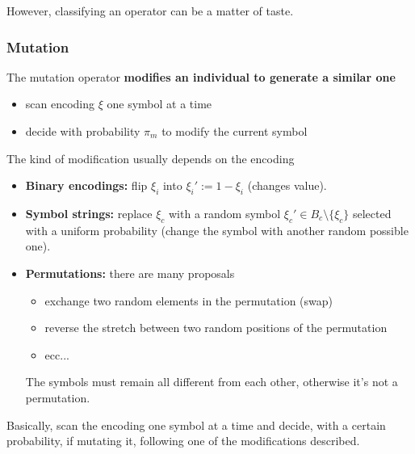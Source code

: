 However, classifying an operator can be a matter of taste.\\

\newpage

\subsubsection{Mutation}

The mutation operator \textbf{modifies an individual to generate a similar one}
\begin{itemize}
	\item scan encoding $\xi$ one symbol at a time
	\item decide with probability $\pi_m$ to modify the current symbol
\end{itemize}

The kind of modification usually depends on the encoding
\begin{itemize}
	\item \textbf{Binary encodings:} flip $\xi_i$ into $\xi_i' := 1 − \xi_i$ (changes value).\\
	
	\item \textbf{Symbol strings:} replace $\xi_c$ with a random symbol $\xi_c' \in B_c \setminus \{\xi_c \}$ selected with a uniform probability (change the symbol with another random possible one).\\
	
	\item \textbf{Permutations:} there are many proposals
	\begin{itemize}
		\item exchange two random elements in the permutation (swap)
		\item reverse the stretch between two random positions of the permutation
		\item ecc...
	\end{itemize}
	The symbols must remain all different from each other, otherwise it's not a permutation.\\
\end{itemize}

Basically, scan the encoding one symbol at a time and decide, with a certain probability, if mutating it, following one of the modifications described.\\

